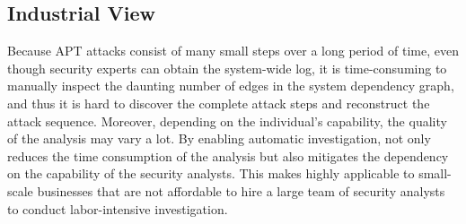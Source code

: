 \subsection{Industrial View}
Because APT attacks consist of many small steps over a long period of time, even though security experts can obtain the system-wide log, it is time-consuming to manually inspect the daunting number of edges in the system dependency graph, and thus it is hard to discover the complete attack steps and reconstruct the attack sequence.
Moreover, depending on the individual’s capability, the quality of the analysis may vary a lot. 
By enabling automatic investigation, \tool not only reduces the time consumption of the analysis but also mitigates the dependency on the capability of the security analysts.
This makes \tool highly applicable to small-scale businesses that are not affordable to hire a large team of security analysts to conduct labor-intensive investigation. 




